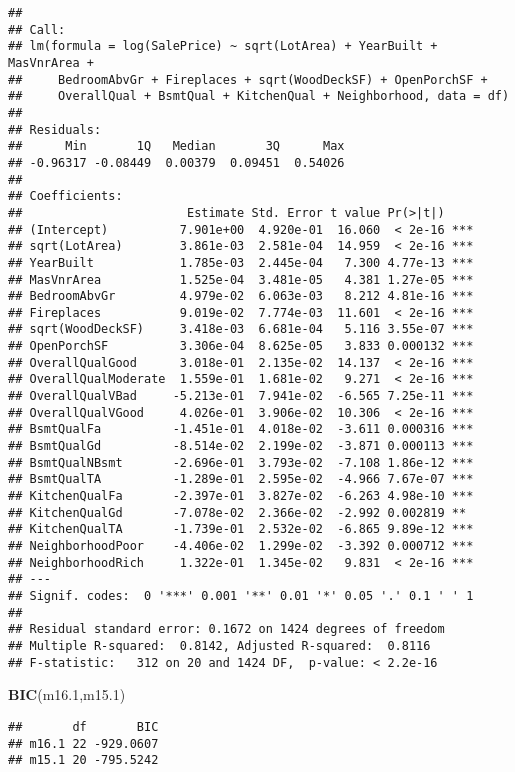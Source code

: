 \documentclass[
]{article}
\newenvironment{Shaded}{\begin{snugshade}}{\end{snugshade}}
\newcommand{\FloatTok}[1]{\textcolor[rgb]{0.00,0.00,0.81}{#1}}
\newcommand{\FunctionTok}[1]{\textcolor[rgb]{0.13,0.29,0.53}{\textbf{#1}}}
\newcommand{\NormalTok}[1]{#1}
\begin{document}
\begin{verbatim}
## 
## Call:
## lm(formula = log(SalePrice) ~ sqrt(LotArea) + YearBuilt + MasVnrArea + 
##     BedroomAbvGr + Fireplaces + sqrt(WoodDeckSF) + OpenPorchSF + 
##     OverallQual + BsmtQual + KitchenQual + Neighborhood, data = df)
## 
## Residuals:
##      Min       1Q   Median       3Q      Max 
## -0.96317 -0.08449  0.00379  0.09451  0.54026 
## 
## Coefficients:
##                       Estimate Std. Error t value Pr(>|t|)    
## (Intercept)          7.901e+00  4.920e-01  16.060  < 2e-16 ***
## sqrt(LotArea)        3.861e-03  2.581e-04  14.959  < 2e-16 ***
## YearBuilt            1.785e-03  2.445e-04   7.300 4.77e-13 ***
## MasVnrArea           1.525e-04  3.481e-05   4.381 1.27e-05 ***
## BedroomAbvGr         4.979e-02  6.063e-03   8.212 4.81e-16 ***
## Fireplaces           9.019e-02  7.774e-03  11.601  < 2e-16 ***
## sqrt(WoodDeckSF)     3.418e-03  6.681e-04   5.116 3.55e-07 ***
## OpenPorchSF          3.306e-04  8.625e-05   3.833 0.000132 ***
## OverallQualGood      3.018e-01  2.135e-02  14.137  < 2e-16 ***
## OverallQualModerate  1.559e-01  1.681e-02   9.271  < 2e-16 ***
## OverallQualVBad     -5.213e-01  7.941e-02  -6.565 7.25e-11 ***
## OverallQualVGood     4.026e-01  3.906e-02  10.306  < 2e-16 ***
## BsmtQualFa          -1.451e-01  4.018e-02  -3.611 0.000316 ***
## BsmtQualGd          -8.514e-02  2.199e-02  -3.871 0.000113 ***
## BsmtQualNBsmt       -2.696e-01  3.793e-02  -7.108 1.86e-12 ***
## BsmtQualTA          -1.289e-01  2.595e-02  -4.966 7.67e-07 ***
## KitchenQualFa       -2.397e-01  3.827e-02  -6.263 4.98e-10 ***
## KitchenQualGd       -7.078e-02  2.366e-02  -2.992 0.002819 ** 
## KitchenQualTA       -1.739e-01  2.532e-02  -6.865 9.89e-12 ***
## NeighborhoodPoor    -4.406e-02  1.299e-02  -3.392 0.000712 ***
## NeighborhoodRich     1.322e-01  1.345e-02   9.831  < 2e-16 ***
## ---
## Signif. codes:  0 '***' 0.001 '**' 0.01 '*' 0.05 '.' 0.1 ' ' 1
## 
## Residual standard error: 0.1672 on 1424 degrees of freedom
## Multiple R-squared:  0.8142, Adjusted R-squared:  0.8116 
## F-statistic:   312 on 20 and 1424 DF,  p-value: < 2.2e-16
\end{verbatim}

\begin{Shaded}
\begin{Highlighting}[]
\FunctionTok{BIC}\NormalTok{(m16}\FloatTok{.1}\NormalTok{,m15}\FloatTok{.1}\NormalTok{)}
\end{Highlighting}
\end{Shaded}

\begin{verbatim}
##       df       BIC
## m16.1 22 -929.0607
## m15.1 20 -795.5242
\end{verbatim}
\end{document}
